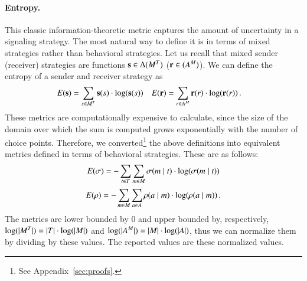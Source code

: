 \paragraph{Entropy.} This classic information-theoretic metric captures
the amount of uncertainty in a signaling strategy.  The most natural
way to define it is in terms of mixed strategies rather than
behavioral strategies.  Let us recall that mixed sender (receiver)
strategies are functions $\mathrm{\mathbf{s}} \in \Delta(M^T)$
($\mathrm{\mathbf{r}} \in (A^M)$).  We can define the entropy of a
sender and receiver strategy as
\begin{align*}
  E(\mathrm{\mathbf{s}}) & = \sum_{s \in M^T} \mathrm{\mathbf{s}}(s) \cdot
  \log(\mathrm{\mathbf{s}}(s)) & 
  E(\mathrm{\mathbf{r}}) & = \sum_{r \in A^M} \mathrm{\mathbf{r}}(r) \cdot \log(\mathrm{\mathbf{r}}(r)) \,.
\end{align*} 
These metrics are computationally expensive to calculate, since the
size of the domain over which the sum is computed grows exponentially
with the number of choice points.  Therefore, we
converted\footnote{See Appendix~\ref{sec:proofs}.} the above
definitions into equivalent metrics defined in terms of behavioral
strategies.  These are as follows:
\begin{align*}
  E(\sigma) = -\sum_{t \in T} \sum_{m \in M}
  \sigma(m \mid t) \cdot \log(\sigma(m \mid
  t)) 
\end{align*} 
\begin{align*}
  E(\rho) = -\sum_{m \in M} \sum_{a \in A}
  \rho(a \mid m) \cdot \log(\rho(a \mid
  m)) \,. 
\end{align*}
The metrics are lower bounded by $0$ and upper bounded by,
respectively, $\log(|M^T|) = |T| \cdot
\log(|M|)$ and $\log(|A^M|) = |M| \cdot
\log(|A|)$, thus we can normalize them by dividing by these
values. The reported values are these normalized values.

